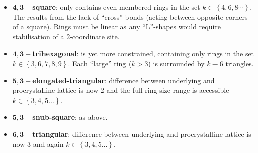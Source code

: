 \begin{itemize}
	\item $\mathbf{4,3-}$\textbf{square}: only contains even\--membered rings in the set $k\in\left\{4,6,8\cdots\right\}$. The results from the lack of ``cross'' bonds (acting between opposite corners of a square). Rings must be linear as any ``L''\--shapes would require stabilisation of a $2$\--coordinate site. 
	\item $\mathbf{4,3-}$\textbf{trihexagonal}: is yet more constrained, containing only rings in the set $k\in\left\{3,6,7,8,9\right\}$. Each ``large'' ring ($k>3$) is surrounded by $k-6$ triangles.
	\item $\mathbf{5,3-}$\textbf{elongated\--triangular}: difference between underlying and procrystalline lattice is now $2$ and the full ring size range is accessible $k\in\left\{3,4,5\dots\right\}$.
	\item $\mathbf{5,3-}$\textbf{snub\--square}: as above.
	\item $\mathbf{6,3-}$\textbf{triangular}: difference between underlying and procrystalline lattice is now $3$ and again $k\in\left\{3,4,5\dots\right\}$.	
\end{itemize}

